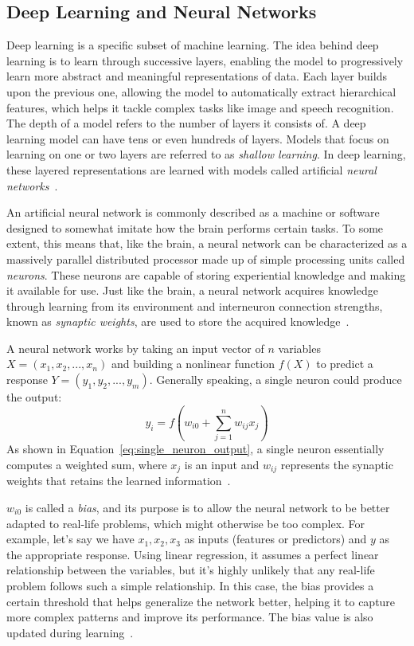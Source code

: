 \documentclass[a4paper,oneside,onecolumn,12pt]{book}
\begin{document}
	\subsection{Deep Learning and Neural Networks}
	Deep learning is a specific subset of machine learning. The idea behind deep learning is to learn through successive layers, enabling the model to progressively learn more abstract and meaningful representations of data. Each layer builds upon the previous one, allowing the model to automatically extract hierarchical features, which helps it tackle complex tasks like image and speech recognition. The depth of a model refers to the number of layers it consists of. A deep learning model can have tens or even hundreds of layers. Models that focus on learning on one or two layers are referred to as \textit{shallow learning}. In deep learning, these layered representations are learned with models called artificial \textit{neural networks}~\cite{DLP}.

	An artificial neural network is commonly described as a machine or software designed to somewhat imitate how the brain performs certain tasks. To some extent, this means that, like the brain, a neural network can be characterized as a massively parallel distributed processor made up of simple processing units called \textit{neurons}. These neurons are capable of storing experiential knowledge and making it available for use. Just like the brain, a neural network acquires knowledge through learning from its environment and interneuron connection strengths, known as \textit{synaptic weights}, are used to store the acquired knowledge~\cite{NNACF}.

	A neural network works by taking an input vector of $n$ variables $X = (x_1, x_2, ..., x_n)$ and building a nonlinear function $f(X)$ to predict a response $Y = (y_1, y_2, ..., y_m)$. Generally speaking, a single neuron could produce the output:
	\begin{equation}
		y_i = f\left( w_{i0} + \sum_{j=1}^{n} w_{ij} x_j \right)
		\label{eq:single_neuron_output}
	\end{equation}
	As shown in Equation~\ref{eq:single_neuron_output}, a single neuron essentially computes a weighted sum, where $x_j$ is an input and $w_{ij}$ represents the synaptic weights that retains the learned information~\cite{AISL}.

	$w_{i0}$ is called a \textit{bias}, and its purpose is to allow the neural network to be better adapted to real-life problems, which might otherwise be too complex. For example, let's say we have $x_1, x_2, x_3$ as inputs (features or predictors) and $y$ as the appropriate response. Using linear regression, it assumes a perfect linear relationship between the variables, but it's highly unlikely that any real-life problem follows such a simple relationship. In this case, the bias provides a certain threshold that helps generalize the network better, helping it to capture more complex patterns and improve its performance. The bias value is also updated during learning~\cite{AISL}.
\end{document}
